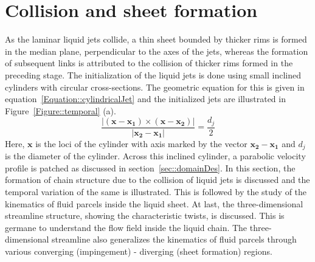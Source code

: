 \section{Collision and sheet formation}
As the laminar liquid jets collide, a thin sheet bounded by thicker rims is formed in the median plane, perpendicular to the axes of the jets, whereas the formation of subsequent links is attributed to the collision of thicker rims formed in the preceding stage. The initialization of the liquid jets is done using small inclined cylinders with circular cross-sections. The geometric equation for this is given in equation~\ref{Equation::cylindricalJet} and the initialized jets are illustrated in Figure~\ref{Figure::temporal} (a).
\begin{equation}\label{Equation::cylindricalJet}
\frac{|(\mathbf{x} - \mathbf{x_1})\times(\mathbf{x} - \mathbf{x_2})|}{|\mathbf{x_2} - \mathbf{x_1}|} = \frac{d_j}{2}
\end{equation}
Here, $\mathbf{x}$ is the loci of the cylinder with axis marked by the vector $\mathbf{x_2 - x_1}$ and $d_j$ is the diameter of the cylinder. Across this inclined cylinder, a parabolic velocity profile is patched as discussed in section~\ref{sec::domainDes}. In this section, the formation of chain structure due to the collision of liquid jets is discussed and the temporal variation of the same is illustrated. This is followed by the study of the kinematics of fluid parcels inside the liquid sheet. At last, the three-dimensional streamline structure, showing the characteristic twists, is discussed. This is germane to understand the flow field inside the liquid chain. The three-dimensional streamline also generalizes the kinematics of fluid parcels through various converging (impingement) - diverging (sheet formation) regions. 
